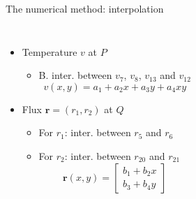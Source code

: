 \documentclass{beamer}
\begin{document}
    \begin{frame}{The numerical method: interpolation}
        \begin{columns}
                \begin{itemize}
                    \item Temperature $v$ at $P$
                    \begin{itemize}
                        \item B. inter. between $v_7$, $v_8$, $v_{13}$ and $v_{12}$
                        \begin{equation*}
                            v(x, y) = a_1 + a_2 x + a_3 y + a_4 xy
                        \end{equation*}
                    \end{itemize}
                    \item Flux $\bm{r} = (r_1, r_2)$ at $Q$
                    \begin{itemize}
                        \item For $r_1$: inter. between $r_5$ and $r_6$
                        \item For $r_2$: inter. between $r_{20}$ and $r_{21}$ 
                        \begin{equation*}
                            \bm{r}(x, y) = \begin{bmatrix}
                                b_1 + b_2 x \\
                                b_3 + b_4 y
                            \end{bmatrix}
                        \end{equation*}
                    \end{itemize}
                    
                \end{itemize}
            

\end{columns}
\end{frame}
\end{document}
